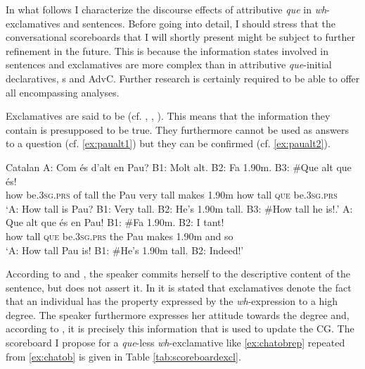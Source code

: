In what follows I characterize the discourse effects of attributive \emph{que} in \textit{wh}-exclamatives and  sentences. Before going into detail,  I should stress that the conversational scoreboards that I will shortly present might  be subject to further refinement  in the future. This is because the information states involved in  sentences and exclamatives are more complex  than in attributive \emph{que}-initial declaratives, s and  AdvC. Further research is certainly required to be able to offer  all encompassing analyses.


Exclamatives are said to be  (cf. \citealt{Grimshaw1979}, \citealt{Zanuttini2003}, \citealt{Castroviejo2006}). This means that the information they contain is presupposed to be true. They  furthermore cannot be used as answers to a question (cf. \ref{ex:paualt1}) but they can be confirmed (cf. \ref{ex:paualt2}). 

\ea  Catalan
\ea\label{ex:paualt1}
 \gll A: Com és d'alt en Pau? B1: Molt alt. B2: Fa 1.90m. B3: \#Que alt que és! \\
{} how be.\textsc{3sg.prs} {of tall} the Pau {} very tall {} makes 1.90m {} how tall \textsc{que} be.\textsc{3sg.prs}\\
\glt `A: How tall is Pau? B1: Very tall. B2: He's 1.90m tall. B3: \#How tall he is!.'
\ex\label{ex:paualt2} \gll A: Que alt que és en Pau! B1: \#Fa 1.90m. B2: I tant!\\
{} how tall \textsc{que} be.\textsc{3sg.prs} the Pau {} makes 1.90m {} and so\\
\glt `A: How tall Pau is! B1: \#He's 1.90m tall. B2: Indeed!'  
\z
\z

According to \citet{Gunlogson2003} and \citet{Castroviejo2006}, the speaker commits herself to the descriptive content of the sentence, but does not assert it. In \citet{Castroviejo2006} it is stated that exclamatives  denote the fact that an individual has the property expressed by the \textit{wh}-expression to a high degree. The speaker furthermore expresses her attitude towards the degree and, according to \citet{Castroviejo2006}, it is precisely this information that is used to update the CG. The  scoreboard I propose for a \emph{que}-less \textit{wh}-exclamative like \eqref{ex:chatobrep} repeated from \eqref{ex:chatob} is given in Table \ref{tab:scoreboardexcl}.



